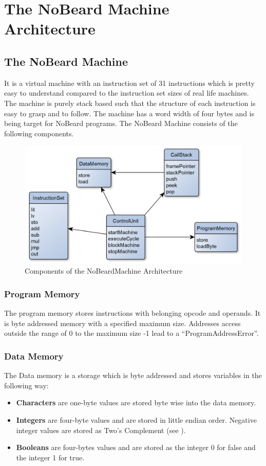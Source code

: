 \chapter{The NoBeard Machine Architecture}
\section{The NoBeard Machine}
It is a virtual machine with an instruction set of 31 instructions which is pretty easy to understand compared to the instruction set sizes of real life machines. The machine is purely stack based such that the structure of each instruction is easy to grasp and to follow. The machine has a word width of four bytes and is being target for NoBeard programs. The NoBeard Machine consists of the following components.
\begin{figure}[h] 
	\centering
	\includegraphics[scale=.62]{images/componentsOfNbM.png}
	\caption{Components of the NoBeardMachine Architecture}
	\label{fig:componentsOfNbM}
\end{figure}
\subsection{Program Memory}
The program memory stores instructions with belonging opcode and operands. It is byte addressed memory with a specified maximum size. Addresses access outside the range of 0 to the maximum size -1 lead to a “ProgramAddressError”.
\subsection{Data Memory} 
\label{ssec:dataMemory}
The Data memory is a storage which is byte addressed and stores variables in the following way:
\begin{itemize}
\item \textbf{Characters }are one-byte values are stored byte wise into the data memory. 
\item \textbf{Integers }are four-byte values and are stored in little endian order. Negative integer values are stored as Two’s Complement (see \cite{wikipedia_twos_2018}).
\item \textbf{Booleans }are four-bytes values and are stored as the integer 0 for false and the integer 1 for true.
\end{itemize}

